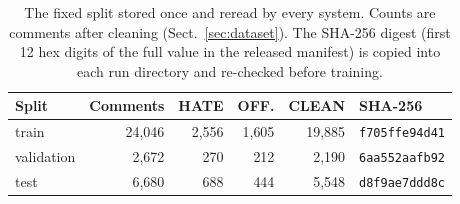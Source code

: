 \begin{table}[t]
\centering
\small
\setlength{\tabcolsep}{4pt}
\caption{The fixed split stored once and reread by every system.  Counts are
comments after cleaning (Sect.~\ref{sec:dataset}).  The SHA-256 digest (first
12 hex digits of the full value in the released manifest) is copied into each run
directory and re-checked before training.}
\label{tab:splits}
\begin{tabular}{lrrrrl}
\toprule
Split & Comments & HATE & OFF. & CLEAN & SHA-256 \\
\midrule
train      & 24{,}046 & 2{,}556 & 1{,}605 & 19{,}885 & \texttt{f705ffe94d41} \\
validation & 2{,}672  & 270     & 212     & 2{,}190  & \texttt{6aa552aafb92} \\
test       & 6{,}680  & 688     & 444     & 5{,}548  & \texttt{d8f9ae7ddd8c} \\
\bottomrule
\end{tabular}
\end{table}
